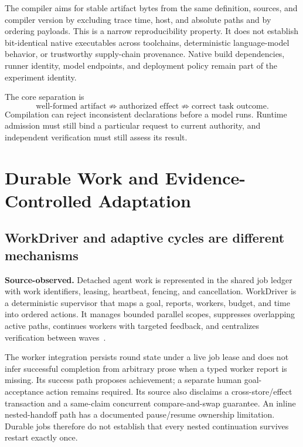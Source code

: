 The compiler aims for stable artifact bytes from the same definition, sources, and compiler version by excluding trace time, host, and absolute paths and by ordering payloads. This is a narrow reproducibility property. It does not establish bit-identical native executables across toolchains, deterministic language-model behavior, or trustworthy supply-chain provenance. Native build dependencies, runner identity, model endpoints, and deployment policy remain part of the experiment identity.

The core separation is
\begin{equation}
\text{well-formed artifact} \not\Rightarrow
\text{authorized effect} \not\Rightarrow
\text{correct task outcome}.
\label{eq:separation}
\end{equation}
Compilation can reject inconsistent declarations before a model runs. Runtime admission must still bind a particular request to current authority, and independent verification must still assess its result.

\section{Durable Work and Evidence-Controlled Adaptation}
\label{sec:durability}

\subsection{WorkDriver and adaptive cycles are different mechanisms}

\textbf{Source-observed.} Detached agent work is represented in the shared job ledger with work identifiers, leasing, heartbeat, fencing, and cancellation. WorkDriver is a deterministic supervisor that maps a goal, reports, workers, budget, and time into ordered actions. It manages bounded parallel scopes, suppresses overlapping active paths, continues workers with targeted feedback, and centralizes verification between waves~\cite{ref20,ref21}.

The worker integration persists round state under a live job lease and does not infer successful completion from arbitrary prose when a typed worker report is missing. Its success path proposes achievement; a separate human goal-acceptance action remains required. Its source also disclaims a cross-store/effect transaction and a same-claim concurrent compare-and-swap guarantee. An inline nested-handoff path has a documented pause/resume ownership limitation. Durable jobs therefore do not establish that every nested continuation survives restart exactly once.

